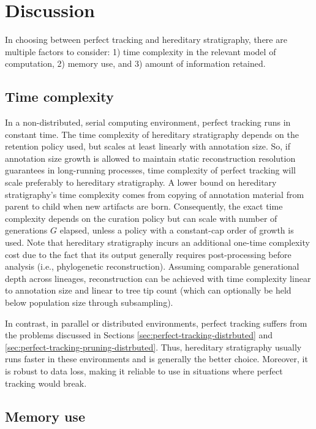 \section{Discussion} \label{sec:discussion}

In choosing between perfect tracking and hereditary stratigraphy, there are multiple factors to consider: 1) time complexity in the relevant model of computation, 2) memory use, and 3) amount of information retained.

\subsection{Time complexity}

In a non-distributed, serial computing environment, perfect tracking runs in constant time.
The time complexity of hereditary stratigraphy depends on the retention policy used, but scales at least linearly with annotation size.
So, if annotation size growth is allowed to maintain static reconstruction resolution guarantees in long-running processes, time complexity of perfect tracking will scale preferably to hereditary stratigraphy.
A lower bound on hereditary stratigraphy's time complexity comes from copying of annotation material from parent to child when new artifacts are born.
Consequently, the exact time complexity depends on the curation policy but can scale with number of generations $G$ elapsed, unless a policy with a constant-cap order of growth is used.
Note that hereditary stratigraphy incurs an additional one-time complexity cost due to the fact that its output generally requires post-processing before analysis (i.e., phylogenetic reconstruction).
Assuming comparable generational depth across lineages, reconstruction can be achieved with time complexity linear to annotation size and linear to tree tip count (which can optionally be held below population size through subsampling).

In contrast, in parallel or distributed environments, perfect tracking suffers from the problems discussed in Sections \ref{sec:perfect-tracking-distrbuted} and \ref{sec:perfect-tracking-pruning-distrbuted}.
Thus, hereditary stratigraphy usually runs faster in these environments and is generally the better choice.
Moreover, it is robust to data loss, making it reliable to use in situations where perfect tracking would break.

\subsection{Memory use}

